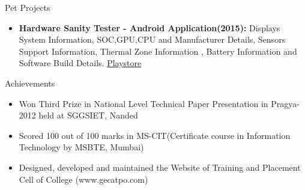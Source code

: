 \documentclass[]{mcdowellcv}
\begin{document}
	\begin{cvsection}{Pet Projects}
		\begin{cvsubsection}{}{}{}	
			\begin{itemize}
				\item \textbf{Hardware Sanity Tester - Android Application(2015): } Displays System Information, SOC,GPU,CPU and Manufacturer Details, Sensors Support Information, Thermal Zone Information , Battery Information and Software Build Details. \href{https://play.google.com/store/apps/details?id=com.pawanbathe.hardwaresanitytester}{Playstore}
			\end{itemize}
		\end{cvsubsection}
	\end{cvsection}
	
	\begin{cvsection}{Achievements}
		\begin{cvsubsection}{}{}{}	
			\begin{itemize}
				\item Won Third Prize in National Level Technical Paper Presentation in Pragya-2012 held at SGGSIET, Nanded
				\item Scored 100 out of 100 marks in MS-CIT(Certificate course in Information Technology by MSBTE, Mumbai)
				\item Designed, developed and maintained the Website of Training and Placement Cell of College (www.gecatpo.com)
			\end{itemize}
		\end{cvsubsection}
	\end{cvsection}	
	
\end{document}
